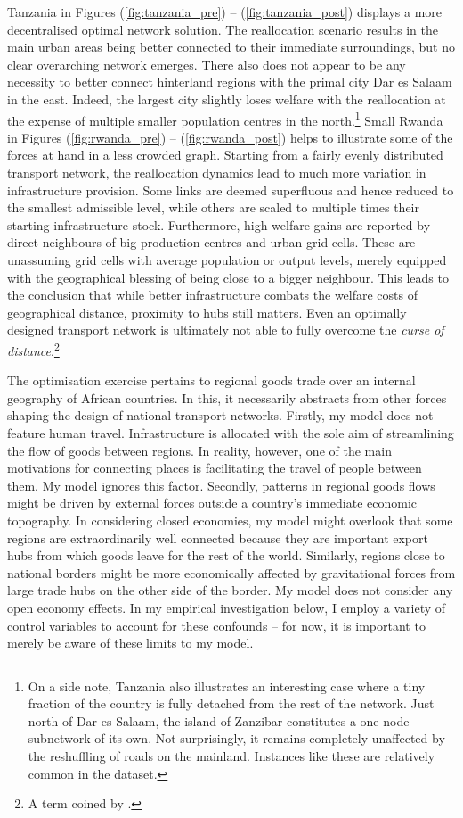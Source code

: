 \documentclass[11pt, oneside]{article}   	%
\let\oldref\ref
\renewcommand{\ref}[1]{(\oldref{#1})}
\begin{document}
Tanzania in Figures \ref{fig:tanzania_pre} -- \ref{fig:tanzania_post} displays a more decentralised optimal network solution. The reallocation scenario results in the main urban areas being better connected to their immediate surroundings, but no clear overarching network emerges. There also does not appear to be any necessity to better connect hinterland regions with the primal city Dar es Salaam in the east. Indeed, the largest city slightly loses welfare with the reallocation at the expense of multiple smaller population centres in the north.\footnote{On a side note, Tanzania also illustrates an interesting case where a tiny fraction of the country is fully detached from the rest of the network. Just north of Dar es Salaam, the island of Zanzibar constitutes a one-node subnetwork of its own. Not surprisingly, it remains completely unaffected by the reshuffling of roads on the mainland. Instances like these are relatively common in the dataset.} Small Rwanda in Figures \ref{fig:rwanda_pre} -- \ref{fig:rwanda_post} helps to illustrate some of the forces at hand in a less crowded graph. Starting from a fairly evenly distributed transport network, the reallocation dynamics lead to much more variation in infrastructure provision. Some links are deemed superfluous and hence reduced to the smallest admissible level, while others are scaled to multiple times their starting infrastructure stock. Furthermore, high welfare gains are reported by direct neighbours of big production centres and urban grid cells. These are unassuming grid cells with average population or output levels, merely equipped with the geographical blessing of being close to a bigger neighbour. This leads to the conclusion that while better infrastructure combats the welfare costs of geographical distance, proximity to hubs still matters. Even an optimally designed transport network is ultimately not able to fully overcome the \emph{curse of distance}.\footnote{A term coined by \cite{Boulhol_Havedevelopedcountries_2010}.}

The optimisation exercise pertains to regional goods trade over an internal geography of African countries. In this, it necessarily abstracts from other forces shaping the design of national transport networks. Firstly, my model does not feature human travel. Infrastructure is allocated with the sole aim of streamlining the flow of goods between regions. In reality, however, one of the main motivations for connecting places is facilitating the travel of people between them. My model ignores this factor. Secondly, patterns in regional goods flows might be driven by external forces outside a country's immediate economic topography. In considering closed economies, my model might overlook that some regions are extraordinarily well connected because they are important export hubs from which goods leave for the rest of the world. Similarly, regions close to national borders might be more economically affected by gravitational forces from large trade hubs on the other side of the border. My model does not consider any open economy effects. In my empirical investigation below, I employ a variety of control variables to account for these confounds -- for now, it is important to merely be aware of these limits to my model.
\end{document}
